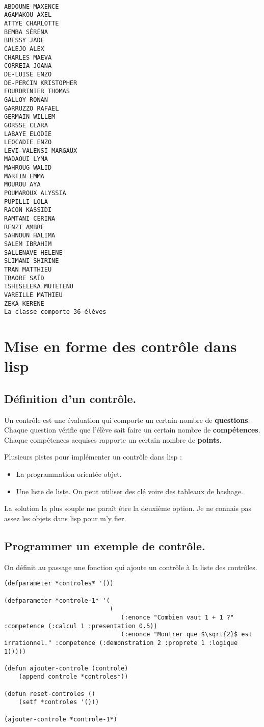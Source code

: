 \documentclass[a4paper, 11pt, DIV=18]{scrartcl}
\begin{document}
\begin{verbatim}

ABDOUNE MAXENCE
AGAMAKOU AXEL
ATTYE CHARLOTTE
BEMBA SÉRÉNA
BRESSY JADE
CALEJO ALEX
CHARLES MAEVA
CORREIA JOANA
DE-LUISE ENZO
DE-PERCIN KRISTOPHER
FOURDRINIER THOMAS
GALLOY RONAN
GARRUZZO RAFAEL
GERMAIN WILLEM
GORSSE CLARA
LABAYE ELODIE
LEOCADIE ENZO
LEVI-VALENSI MARGAUX
MADAOUI LYMA
MAHROUG WALID
MARTIN EMMA
MOUROU AYA
POUMAROUX ALYSSIA
PUPILLI LOLA
RACON KASSIDI
RAMTANI CERINA
RENZI AMBRE
SAHNOUN HALIMA
SALEM IBRAHIM
SALLENAVE HELENE
SLIMANI SHIRINE
TRAN MATTHIEU
TRAORE SAÏD
TSHISELEKA MUTETENU
VAREILLE MATHIEU
ZEKA KERENE
La classe comporte 36 élèves
\end{verbatim}

\section{Mise en forme des contrôle dans lisp}
\label{sec:org37b4570}

\subsection{Définition d'un contrôle.}
\label{sec:org7947ef2}

Un contrôle est une évaluation qui comporte un certain nombre de \textbf{questions}.
Chaque question vérifie que l'élève sait faire un certain nombre de
\textbf{compétences}. Chaque compétences acquises rapporte un certain nombre de \textbf{points}.

Plusieurs pistes pour implémenter un contrôle dans lisp :
\begin{itemize}
\item La programmation orientée objet.
\item Une liste de liste. On peut utiliser des clé voire des tableaux de hashage.
\end{itemize}

La solution la plus souple me paraît être la deuxième option. Je ne connais pas
assez les objets dans lisp pour m'y fier.

\subsection{Programmer un exemple de contrôle.}
\label{sec:orge8bf67e}

On définit au passage une fonction qui ajoute un contrôle à la liste des contrôles.
\begin{verbatim}
(defparameter *controles* '())

(defparameter *controle-1* '(
                             (
                                (:enonce "Combien vaut 1 + 1 ?" :competence (:calcul 1 :presentation 0.5))
                                (:enonce "Montrer que $\sqrt{2}$ est irrationnel." :competence (:demonstration 2 :proprete 1 :logique 1)))))

(defun ajouter-controle (controle)
    (append controle *controles*))

(defun reset-controles ()
    (setf *controles '()))

(ajouter-controle *controle-1*)
\end{verbatim}
\end{document}
